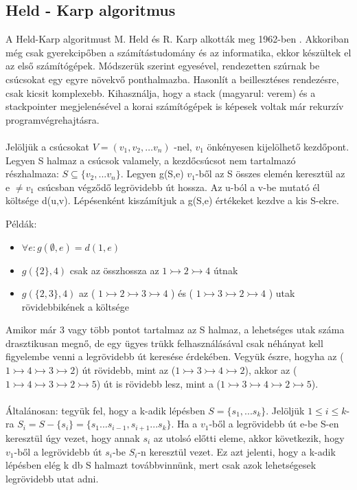 \subsection{Held - Karp algoritmus }
A Held-Karp algoritmust M. Held és R. Karp alkották meg 1962-ben \cite{HeldKarp}. Akkoriban még csak gyerekcipőben a számítástudomány és az informatika, ekkor készültek el az első számítógépek. Módszerük szerint egyesével, rendezetten szúrnak be csúcsokat egy egyre növekvő ponthalmazba. Hasonlít a beillesztéses rendezésre, csak kicsit komplexebb. Kihasználja, hogy a stack (magyarul: verem) és a stackpointer megjelenésével a korai számítógépek is képesek voltak már rekurzív programvégrehajtásra.
\paragraph{}
Jelöljük a csúcsokat \( V=\left(v_1,v_2,\ldots v_n\right) \) -nel, \(v_1\) önkényesen kijelölhető kezdőpont. Legyen S halmaz a csúcsok valamely, a kezdőcsúcsot nem tartalmazó részhalmaza: \(S \subseteq \{v_2,...v_n\}\). Legyen g(S,e) \(v_1\)-ből az S összes elemén keresztül az e \(\neq v_1\)  csúcsban végződő legrövidebb út hossza. Az u-ból a v-be mutató él költsége d(u,v).
Lépésenként kiszámítjuk a g(S,e) értékeket kezdve a kis S-ekre.

Példák:
\begin{itemize}
	\item \(\forall e: g(\emptyset,e) = d(1,e)\)
	\item \(g(\{2\},4)\) csak az összhossza az  \(1 \rightarrowtail 2 \rightarrowtail 4\) útnak
	\item \(g(\{2,3\},4)\)  az ( \(1 \rightarrowtail 2 \rightarrowtail 3 \rightarrowtail 4\) ) és ( \(1 \rightarrowtail 3 \rightarrowtail 2 \rightarrowtail 4\) ) utak rövidebbikének a költsége
\end{itemize}

Amikor már 3 vagy több pontot tartalmaz az S halmaz, a lehetséges utak száma drasztikusan megnő, de egy ügyes trükk felhasználásával csak néhányat kell figyelembe venni a legrövidebb út keresése érdekében. Vegyük észre, hogyha az (\(1\rightarrowtail 4\rightarrowtail 3\rightarrowtail 2\)) út rövidebb, mint az (\(1\rightarrowtail 3\rightarrowtail 4\rightarrowtail 2\)), akkor az (\(1\rightarrowtail 4\rightarrowtail 3\rightarrowtail 2\rightarrowtail 5\)) út is rövidebb lesz, mint a (\(1\rightarrowtail 3\rightarrowtail 4\rightarrowtail 2\rightarrowtail 5\)).
\paragraph{}
Általánosan: tegyük fel, hogy a k-adik lépésben \(S=\{s_1,...s_k\}\). Jelöljük \(1\leqslant i\leqslant k\)-ra \(S_i = S-\{s_i\} = \{s_1...s_{i-1},s_{i+1}...s_k\} \). Ha a \(v_1\)-ből a legrövidebb út e-be S-en keresztül úgy vezet, hogy annak \(s_i\) az utolsó előtti eleme, akkor következik, hogy \(v_1\)-ből a legrövidebb út \(s_i\)-be \(S_i\)-n keresztül vezet. Ez azt jelenti, hogy a k-adik lépésben elég k db S halmazt továbbvinnünk, mert csak azok lehetségesek legrövidebb utat adni.

